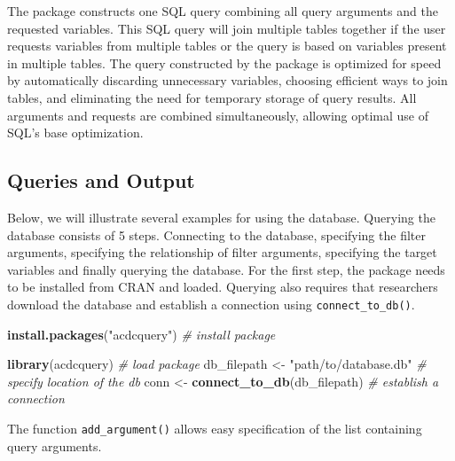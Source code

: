 \documentclass[
  man,floatsintext]{apa6}
\newenvironment{Shaded}{\begin{snugshade}}{\end{snugshade}}
\newcommand{\CommentTok}[1]{\textcolor[rgb]{0.56,0.35,0.01}{\textit{#1}}}
\newcommand{\FunctionTok}[1]{\textcolor[rgb]{0.13,0.29,0.53}{\textbf{#1}}}
\newcommand{\NormalTok}[1]{#1}
\newcommand{\OtherTok}[1]{\textcolor[rgb]{0.56,0.35,0.01}{#1}}
\newcommand{\StringTok}[1]{\textcolor[rgb]{0.31,0.60,0.02}{#1}}
\begin{document}
The package constructs one SQL query combining all query arguments and the requested variables. This SQL query will join multiple tables together if the user requests variables from multiple tables or the query is based on variables present in multiple tables. The query constructed by the package is optimized for speed by automatically discarding unnecessary variables, choosing efficient ways to join tables, and eliminating the need for temporary storage of query results. All arguments and requests are combined simultaneously, allowing optimal use of SQL's base optimization.

\hypertarget{queries-and-output}{%
\subsection{Queries and Output}\label{queries-and-output}}

Below, we will illustrate several examples for using the database. Querying the database consists of 5 steps. Connecting to the database, specifying the filter arguments, specifying the relationship of filter arguments, specifying the target variables and finally querying the database. For the first step, the package needs to be installed from CRAN and loaded. Querying also requires that researchers download the database and establish a connection using \texttt{connect\_to\_db()}.

\begin{Shaded}
\begin{Highlighting}[]
\FunctionTok{install.packages}\NormalTok{(}\StringTok{"acdcquery"}\NormalTok{) }\CommentTok{\# install package}

\FunctionTok{library}\NormalTok{(acdcquery) }\CommentTok{\# load package}
\NormalTok{db\_filepath }\OtherTok{\textless{}{-}} \StringTok{"path/to/database.db"} \CommentTok{\# specify location of the db}
\NormalTok{conn }\OtherTok{\textless{}{-}} \FunctionTok{connect\_to\_db}\NormalTok{(db\_filepath) }\CommentTok{\# establish a connection}
\end{Highlighting}
\end{Shaded}

The function \texttt{add\_argument()} allows easy specification of the list containing query arguments.
\end{document}
